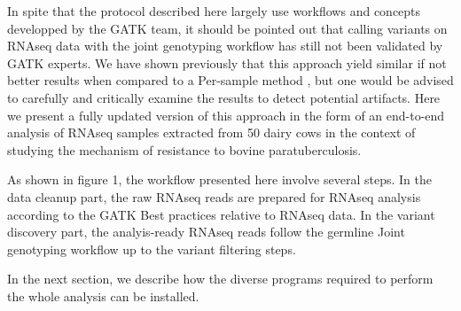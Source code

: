 \documentclass[]{article}
\begin{document}
In spite that the protocol described here largely use workflows and concepts developped by the GATK team, it should be pointed out that calling variants on RNAseq data with the joint genotyping workflow has still not been validated by GATK experts. We have shown previously that this approach yield similar if not better results when compared to a Per-sample method \cite{Brouard2019}, but one would be advised to carefully and critically examine the results to detect potential artifacts. Here we present a fully updated version of this approach in the form of an end-to-end analysis of RNAseq samples extracted from 50 dairy cows in the context of studying the mechanism of resistance to bovine paratuberculosis.


As shown in figure 1, the workflow presented here involve several steps. In the data cleanup part, the raw RNAseq reads are prepared for RNAseq analysis according to the GATK Best practices relative to RNAseq data. In the variant discovery part, the analyis-ready RNAseq reads follow the germline Joint genotyping workflow up to the variant filtering steps.  

 



In the next section, we describe how the diverse programs required to perform the whole analysis can be installed.







\end{document}
